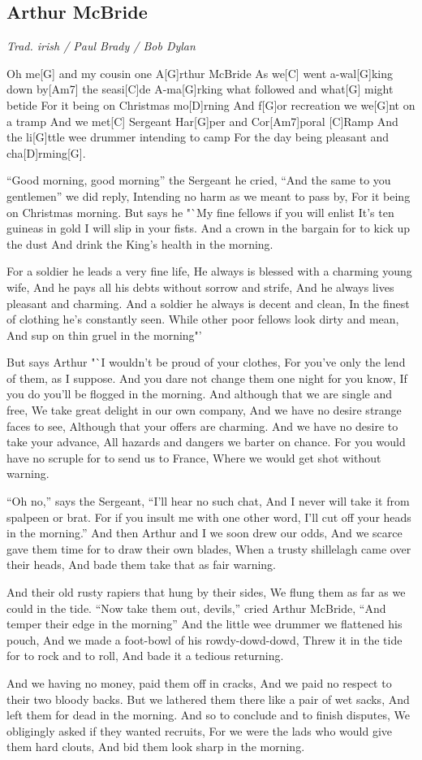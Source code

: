 \documentclass[a5paper,pagesize,twoside,10pt,headings=small]{scrreprt}
\newcommand\songheader[3][]{%
  \clearpage%
    \subsection*{\centering #2}\vspace{0.5\baselineskip}%
    \addcontentsline{toc}{subsection}{#2}
    \centering \textit{#3}\\%
    \vspace{\baselineskip}\par%
}
\begin{document}
\songheader{Arthur McBride}{Trad. irish / Paul Brady / Bob Dylan}
\begin{guitar}
Oh me[G] and my cousin one A[G]rthur McBride
As we[C] went a-wal[G]king down by[Am7] the seasi[C]de
A-ma[G]rking what followed and what[G] might betide
For it being on Christmas mo[D]rning
And f[G]or recreation we we[G]nt on a tramp
And we met[C] Sergeant Har[G]per and Cor[Am7]poral [C]Ramp
And the li[G]ttle wee drummer intending to camp
For the day being pleasant and cha[D]rming[G].

"`Good morning, good morning"' the Sergeant he cried,
"`And the same to you gentlemen"' we did reply,
Intending no harm as we meant to pass by,
For it being on Christmas morning.
But says he "`My fine fellows if you will enlist
It's ten guineas in gold I will slip in your fists.
And a crown in the bargain for to  kick up the dust
And drink the King's health in the morning.

For a soldier he leads a very fine life,
He always is blessed with a charming young wife,
And he pays all his debts without sorrow and strife,
And he always lives pleasant and charming.
And a soldier he always is decent and clean,
In the finest of clothing he's constantly seen.
While other poor fellows look dirty and mean,
And sup on thin gruel in the morning"'

But says Arthur "`I wouldn't be proud of your clothes,
For you've only the lend of them, as I suppose.
And you dare not change them one night for you know,
If you do you'll be flogged in the morning.
And although that we are single and free,
We take great delight in our own company,
And we have no desire strange faces to see,
Although that your offers are charming.
And we have no desire to take your advance,
All hazards and dangers we barter on chance.
For you would have no scruple for to send us to France,
Where we would get shot without warning.

"`Oh no,"' says the Sergeant, "`I'll hear no such chat,
And I never will take it from spalpeen or brat.
For if you insult me with one other word,
I'll cut off your heads in the morning."'
And then Arthur and I we soon drew our odds,
And we scarce gave them time for to draw their own blades,
When a trusty shillelagh came over their heads,
And bade them take that as fair warning.

And their old rusty rapiers that hung by their sides,
We flung them as far as we could in the tide.
"`Now take them out, devils,"' cried Arthur McBride,
"`And temper their edge in the morning"'
And the little wee drummer we flattened his pouch,
And we made a foot-bowl of his rowdy-dowd-dowd,
Threw it in the tide for to rock and to roll,
And bade it a tedious returning.

And we having no money, paid them off in cracks,
And we paid no respect to their two bloody backs.
But we lathered them there like a pair of wet sacks,
And left them for dead in the morning.
And so to conclude and to finish disputes,
We obligingly asked if they wanted recruits,
For we were the lads who would give them hard clouts,
And bid them look sharp in the morning.
\end{guitar}
\end{document}
